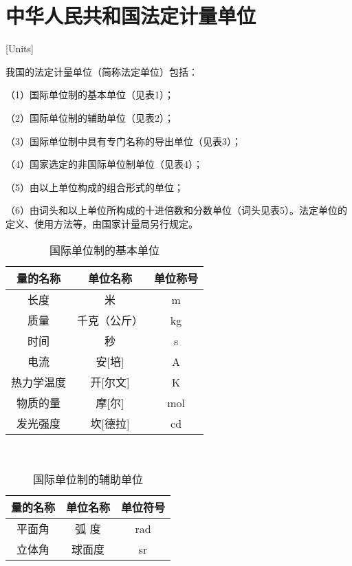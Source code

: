 \chapter{中华人民共和国法定计量单位}[Units]

我国的法定计量单位（简称法定单位）包括：

（1）国际单位制的基本单位（见表1）；

（2）国际单位制的辅助单位（见表2）；

（3）国际单位制中具有专门名称的导出单位（见表3）；

（4）国家选定的非国际单位制单位（见表4）；

（5）由以上单位构成的组合形式的单位；

（6）由词头和以上单位所构成的十进倍数和分数单位（词头见表5）。法定单位的定义、使用方法等，由国家计量局另行规定。 \hspace*{\fill} \\


\begin{table}[htbp]
  \centering
  \caption{国际单位制的基本单位}
  \begin{tabular}{ccc}
    \toprule
    量的名称   & 单位名称     & 单位称号 \\
    \midrule
    长度       & 米           & m        \\
    质量       & 千克（公斤） & kg       \\
    时间       & 秒           & s        \\
    电流       & 安[培]       & A        \\
    热力学温度 & 开[尔文]     & K        \\
    物质的量   & 摩[尔]       & mol      \\
    发光强度   & 坎[德拉]     & cd       \\
    \bottomrule
  \end{tabular}%
  \label{tab:tbl-b1}%
\end{table}%

\hspace*{\fill} \\


\begin{table}[htbp]
  \centering
  \caption{国际单位制的辅助单位}
  \begin{tabular}{ccc}
    \toprule
    量的名称 & 单位名称 & 单位符号 \\
    \midrule
    平面角   & 弧 度    & rad      \\
    立体角   & 球面度   & sr       \\
    \bottomrule
  \end{tabular}%
  \label{tab:tbl-b2}%
\end{table}%

